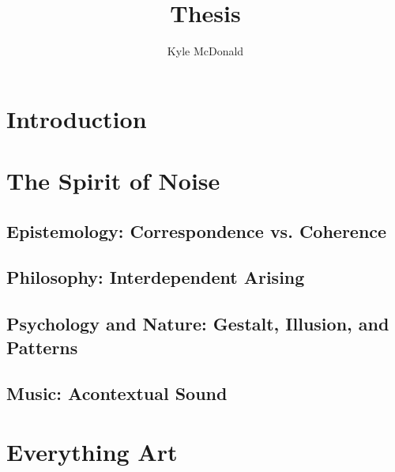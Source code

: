 \documentclass{thesis}
\title{Thesis}
\author{Kyle McDonald}
\begin{document}
\maketitle

\chapter{Introduction}


\chapter{The Spirit of Noise}
\section{Epistemology: Correspondence vs. Coherence}
	\cite{Blackburn07}\cite{seti_about_????}\cite{david_correspondence_????}\cite{david_horvitz_flickr:_????}
	\cite{david_horvitz_flickr:_????-1}\cite{young_coherence_????}
\section{Philosophy: Interdependent Arising}
	\cite{Hofstadter07}\cite{Koller01}\cite{erik_thiele_tempest_????}\cite{francesco_vianello_reality_????}
	\cite{w._wayt_gibbs_hackers_2009}
\section{Psychology and Nature: Gestalt, Illusion, and Patterns}
	\cite{Moore07}\cite{Doczi81}\cite{Hofstadter01}\cite{robin_mckie_secret_2004}
	\cite{alan_dunning_paul_woodrow_and_morley_hollenberg_einsteins_2008}\cite{alexander_bogomolny_kanizsa_????}
	\cite{brian_dunning_facemars_2008}\cite{dan_paluska_holy_2005}\cite{de_lapparent_slice_1986}
	\cite{jochem_van_der_spek_no_2001}\cite{jonathan_feinberg_haiku_????}\cite{michael_bach_dalmatian_2002}
	\cite{michael_m._ross_natural_2007}\cite{padovan_proportion_1999}\cite{rips_equidistant_1994}
	\cite{weisstein_prime_????}\cite{boston.com_religious_????}
\section{Music: Acontextual Sound}
	\cite{Bruen04}\cite{Vannort06}\cite{Attali85}\cite{Cage61}\cite{Sangild04}\cite{Cascone00}
	\cite{Hegarty02}\cite{Kahn01}\cite{Russolo04}
	
\chapter{Everything Art}
\end{document}
